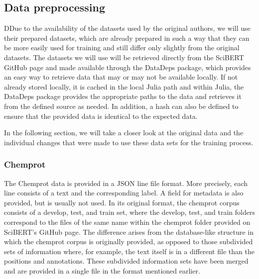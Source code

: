 \subsection{Data preprocessing}
DDue to the availability of the datasets used by the original authors, we will use their prepared datasets, which are already prepared in such a way that they can be more easily used for training and still differ only slightly from the original datasets. The datasets we will use will be retrieved directly from the SciBERT GitHub page and made available through the DataDeps package, which provides an easy way to retrieve data that may or may not be available locally. If not already stored locally, it is cached in the local Julia path and within Julia, the DataDeps package provides the appropriate paths to the data and retrieves it from the defined source as needed. In addition, a hash can also be defined to ensure that the provided data is identical to the expected data.\cite{White2019} 

In the following section, we will take a closer look at the original data and the individual changes that were made to use these data sets for the training process. 

\subsubsection{Chemprot} 

The Chemprot data is provided in a JSON line file format. More precisely, each line consists of a text and the corresponding label. A field for metadata is also provided, but is usually not used. In its original format, the chemprot corpus consists of a develop, test, and train set, where the develop, test, and train folders correspond to the files of the same name within the chemprot folder provided on SciBERT's GitHub page. The difference arises from the database-like structure in which the chemprot corpus is originally provided, as opposed to those subdivided sets of information where, for example, the text itself is in a different file than the positions and annotations. These subdivided information sets have been merged and are provided in a single file in the format mentioned earlier. \cite{Beltagy2019,Wang2016} 

